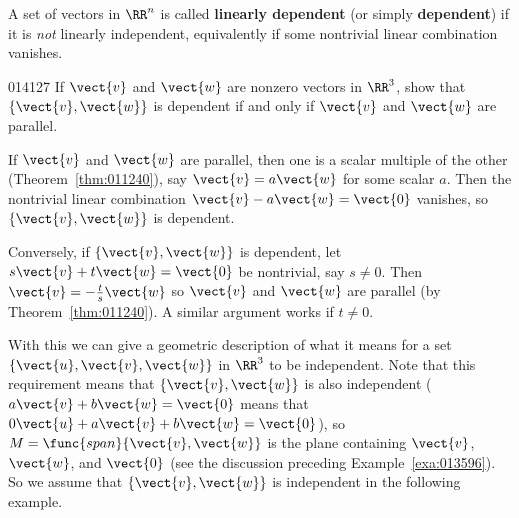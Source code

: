 A set of vectors in $\RR^n$ is called \textbf{linearly dependent} (or simply \textbf{dependent}) if it is \textit{not} linearly independent, equivalently if some nontrivial linear combination vanishes.

\begin{example}{}{014127}
If $\vect{v}$ and $\vect{w}$ are nonzero vectors in $\RR^3$, show that $\{\vect{v}, \vect{w}\}$ is dependent if and only if $\vect{v}$ and $\vect{w}$ are parallel.

\begin{solution}
If $\vect{v}$ and $\vect{w}$ are parallel, then one is a scalar multiple of the other (Theorem~\ref{thm:011240}), say $\vect{v} = a\vect{w}$ for some scalar $a$. Then the nontrivial linear combination $\vect{v} - a\vect{w} = \vect{0}$ vanishes, so $\{\vect{v}, \vect{w}\}$ is dependent.

Conversely, if $\{\vect{v}, \vect{w}\}$ is dependent, let $s\vect{v} + t\vect{w} = \vect{0}$ be nontrivial, say $s \neq 0$. Then $\vect{v} = -\frac{t}{s}\vect{w}$ so $\vect{v}$ and $\vect{w}$ are parallel (by Theorem~\ref{thm:011240}). A similar argument works if $t \neq 0$.
\end{solution}
\end{example}

With this we can give a geometric description of what it means for a set $\{\vect{u}, \vect{v}, \vect{w}\}$ in $\RR^3$ to be independent. Note that this requirement means that $\{\vect{v}, \vect{w}\}$ is also independent ($a\vect{v} + b\vect{w} = \vect{0}$ means that $0\vect{u} + a\vect{v} + b\vect{w} = \vect{0}$), so $M = \func{span}\{\vect{v}, \vect{w}\}$ is the plane containing $\vect{v}$, $\vect{w}$, and $\vect{0}$ (see the discussion preceding Example~\ref{exa:013596}). So we assume that $\{\vect{v}, \vect{w}\}$ is independent in the following example.

